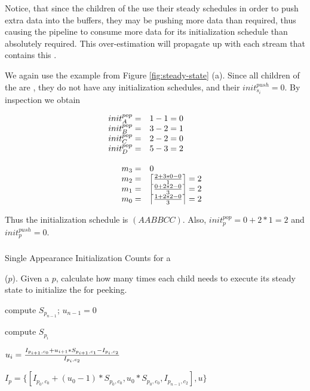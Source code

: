 Notice, that since the children of the {\pipeline} use their steady
schedules in order to push extra data into the buffers, they may
be pushing more data than required, thus causing the pipeline to
consume more data for its initialization schedule than absolutely
required.  This over-estimation will propagate up with each
{\StreamIt} stream that contains this {\pipeline}.

We again use the example from Figure \ref{fig:steady-state} (a).
Since all children of the {\pipeline} are {\filters}, they do not have
any initialization schedules, and their $init^{push}_{s_i} = 0$.
By inspection we obtain

\begin{displaymath}
\begin{array}{rl}
init^{pop}_A = & 1-1=0 \\
init^{pop}_B = & 3-2 = 1 \\
init^{pop}_C = & 2 - 2 = 0 \\
init^{pop}_D = & 5-3=2 \\
\\
m_3 = & 0 \\
m_2 = & \left \lceil 2 + 3 * 0 - 0 \over 1 \right \rceil = 2\\
m_1 = & \left \lceil 0 + 2 * 2 - 0 \over 3 \right \rceil = 2\\
m_0 = & \left \lceil 1 + 2 * 2 - 0 \over 3 \right \rceil = 2\\
\end{array}
\end{displaymath}

Thus the initialization schedule is $(AABBCC)$.  Also,
$init^{pop}_p = 0 + 2 * 1 = 2$ and $init^{push}_p = 0$.

\subsubsection{\splitjoin}

\begin{algorithm}
\caption{Single Appearance Initialization Counts for a {\pipeline}}
{\bf }($p$). Given a {\pipeline} $p$, calculate how many times each
child needs to execute its steady state to initialize the
{\pipeline} for peeking.

\begin{algorithmic}

\STATE compute $S_{p_{n-1}}$; $u_{n-1} = 0$


\STATE compute $S_{p_i}$

\STATE $u_i = {I_{p_{i+1}, c_0} + u_{i+1} * S_{p_{i+1}, c_1} -
I_{p_i, c_2} \over I_{p_i, c_2}}$

\ENDFOR

\STATE $I_p = \{[I_{p_0, c_0} + (u_0 - 1) * S_{p_0, c_0}, u_0 *
S_{p_0, c_0}, I_{p_{n-1}, c_2}] ,u\}$

\end{algorithmic}
\end{algorithm}

